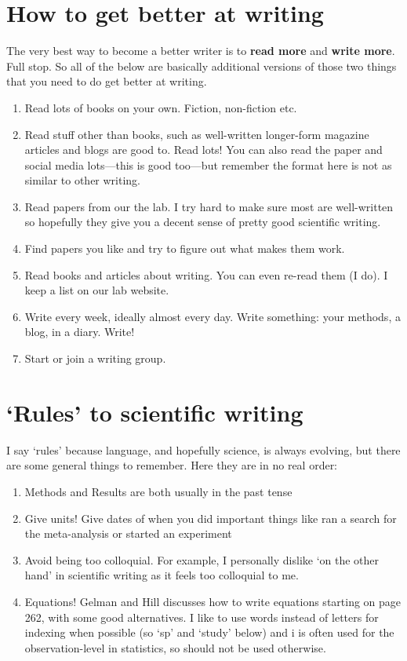 \documentclass[11pt,letter]{article}
\begin{document}
\section{How to get better at writing}

The very best way to become a better writer is to {\bf read more} and {\bf write more}. Full stop. So all of the below are basically additional versions of those two things that you need to do get better at writing. 
\begin{enumerate}
\item Read lots of books on your own. Fiction, non-fiction etc. 
\item Read stuff other than books, such as well-written longer-form magazine articles and blogs are good to. Read lots! You can also read the paper and social media lots---this is good too---but remember the format here is not as similar to other writing. 
\item Read papers from our the lab. I try hard to make sure most are well-written so hopefully they give you a decent sense of pretty good scientific writing.
\item Find papers you like and try to figure out what makes them work. 
\item Read books and articles about writing. You can even re-read them (I do). I keep a list on our lab website.
\item Write every week, ideally almost every day. Write something: your methods, a blog, in a diary. Write!
\item Start or join a writing group. 
\end{enumerate}


\section{`Rules' to scientific writing}

I say `rules' because language, and hopefully science, is always evolving, but there are some general things to remember. Here they are in no real order:

\begin{enumerate}
\item Methods and Results are both usually in the past tense
\item Give units! Give dates of when you did important things like ran a search for the meta-analysis or started an experiment
\item Avoid being too colloquial. For example, I personally dislike `on the other hand' in scientific writing as it feels too colloquial to me. 
\item Equations! Gelman and Hill discusses how to write equations starting on page 262, with some good alternatives. I like to use words instead of letters for indexing when possible (so `sp' and `study' below) and i is often used for the observation-level in statistics, so should not be used otherwise. 
\end{enumerate}
\end{document}
